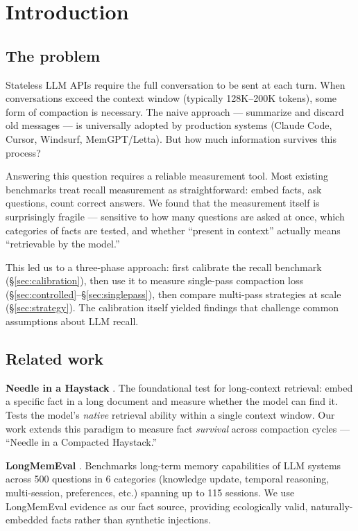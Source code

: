 \section{Introduction}
\label{sec:intro}

\subsection{The problem}
\label{sec:problem}

Stateless LLM APIs require the full conversation to be sent at each turn. When
conversations exceed the context window (typically 128K--200K tokens), some form
of compaction is necessary. The naive approach --- summarize and discard old
messages --- is universally adopted by production systems (Claude Code, Cursor,
Windsurf, MemGPT/Letta). But how much information survives this process?

Answering this question requires a reliable measurement tool. Most existing
benchmarks treat recall measurement as straightforward: embed facts, ask
questions, count correct answers. We found that the measurement itself is
surprisingly fragile --- sensitive to how many questions are asked at once,
which categories of facts are tested, and whether ``present in context'' actually
means ``retrievable by the model.''

This led us to a three-phase approach: first calibrate the recall benchmark
(\S\ref{sec:calibration}), then use it to measure single-pass compaction loss
(\S\ref{sec:controlled}--\S\ref{sec:singlepass}), then compare multi-pass strategies
at scale (\S\ref{sec:strategy}). The calibration itself yielded findings
that challenge common assumptions about LLM recall.

\subsection{Related work}
\label{sec:related}

\textbf{Needle in a Haystack} \citep{kamradt2023needle}. The foundational test for long-context
retrieval: embed a specific fact in a long document and measure whether the
model can find it. Tests the model's \textit{native} retrieval ability within a single
context window. Our work extends this paradigm to measure fact \textit{survival}
across compaction cycles --- ``Needle in a Compacted Haystack.''

\textbf{LongMemEval} \citep{wu2024longmemeval}. Benchmarks long-term memory capabilities
of LLM systems across 500 questions in 6 categories (knowledge update, temporal
reasoning, multi-session, preferences, etc.) spanning up to 115 sessions. We
use LongMemEval evidence as our fact source, providing ecologically valid,
naturally-embedded facts rather than synthetic injections.


